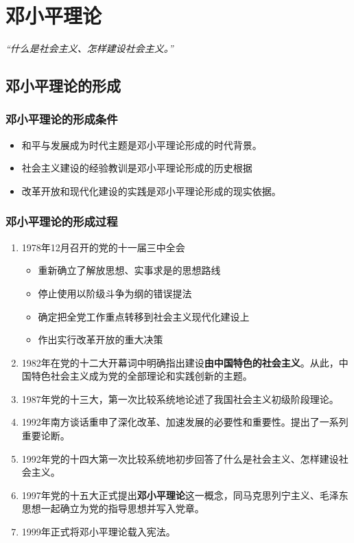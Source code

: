 \chapter{邓小平理论}
\emph{“什么是社会主义、怎样建设社会主义。”}

\section{邓小平理论的形成}
    \subsection{邓小平理论的形成条件}
        \begin{itemize}
            \item 和平与发展成为时代主题是邓小平理论形成的时代背景。
            \item 社会主义建设的经验教训是邓小平理论形成的历史根据
            \item 改革开放和现代化建设的实践是邓小平理论形成的现实依据。
        \end{itemize}

    \subsection{邓小平理论的形成过程}
        \begin{enumerate}
            \item 1978年12月召开的党的十一届三中全会
            \begin{itemize}
                \item 重新确立了解放思想、实事求是的思想路线
                \item 停止使用以阶级斗争为纲的错误提法
                \item 确定把全党工作重点转移到社会主义现代化建设上
                \item 作出实行改革开放的重大决策
            \end{itemize}
            \item 1982年在党的十二大开幕词中明确指出建设\textbf{由中国特色的社会主义}。从此，中国特色社会主义成为党的全部理论和实践创新的主题。
            \item 1987年党的十三大，第一次比较系统地论述了我国社会主义初级阶段理论。
            \item 1992年南方谈话重申了深化改革、加速发展的必要性和重要性。提出了一系列重要论断。
            \item 1992年党的十四大第一次比较系统地初步回答了什么是社会主义、怎样建设社会主义。
            \item 1997年党的十五大正式提出\textbf{邓小平理论}这一概念，同马克思列宁主义、毛泽东思想一起确立为党的指导思想并写入党章。
            \item 1999年正式将邓小平理论载入宪法。
        \end{enumerate}


